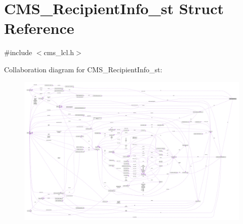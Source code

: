 \hypertarget{struct_c_m_s___recipient_info__st}{}\section{C\+M\+S\+\_\+\+Recipient\+Info\+\_\+st Struct Reference}
\label{struct_c_m_s___recipient_info__st}


{\ttfamily \#include $<$cms\+\_\+lcl.\+h$>$}



Collaboration diagram for C\+M\+S\+\_\+\+Recipient\+Info\+\_\+st\+:\nopagebreak
\begin{figure}[H]
\begin{center}
\leavevmode
\includegraphics[width=350pt]{struct_c_m_s___recipient_info__st__coll__graph}
\end{center}
\end{figure}
